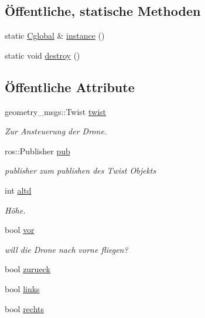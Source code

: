 \subsection*{Öffentliche, statische Methoden}
\begin{DoxyCompactItemize}
\item 
static \hyperlink{class_cglobal}{Cglobal} \& \hyperlink{class_cglobal_a0e96a5f7f00ef5a151da708a17340f08}{instance} ()
\item 
static void \hyperlink{class_cglobal_aa1d07161425d12bc42dd100140407e59}{destroy} ()
\end{DoxyCompactItemize}
\subsection*{Öffentliche Attribute}
\begin{DoxyCompactItemize}
\item 
geometry\_\-msgs::Twist \hyperlink{class_cglobal_acdd49b2fad30faf04785664c422f5ef7}{twist}
\begin{DoxyCompactList}\small\item\em Zur Ansteuerung der Drone. \end{DoxyCompactList}\item 
ros::Publisher \hyperlink{class_cglobal_af3a06302b3bd19de728064359241c1a1}{pub}
\begin{DoxyCompactList}\small\item\em publisher zum publishen des Twist Objekts \end{DoxyCompactList}\item 
int \hyperlink{class_cglobal_a0e2d4712edf675715bd4bcc554dbcf42}{altd}
\begin{DoxyCompactList}\small\item\em Höhe. \end{DoxyCompactList}\item 
bool \hyperlink{class_cglobal_ac0b3c90a19b5395a404bb9e5aee44e1c}{vor}
\begin{DoxyCompactList}\small\item\em will die Drone nach vorne fliegen? \end{DoxyCompactList}\item 
bool \hyperlink{class_cglobal_a1b0b85d52fea92c819e421db042b704d}{zurueck}
\item 
bool \hyperlink{class_cglobal_a10e812f9c1b4e7b7544b959d1b5f120b}{links}
\item 
bool \hyperlink{class_cglobal_a718da04af5940be1ad811f61b85f57d6}{rechts}
\item 

\end{DoxyCompactItemize}
